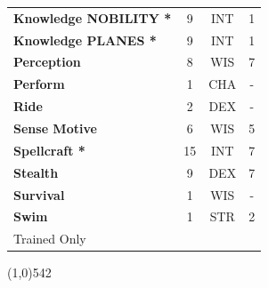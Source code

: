 \documentclass[letterpaper]{article}
\newcommand{\fullline}{\noindent\line(1,0){542} \\}
\newcommand{\B}[1]{\textbf{#1}}
\begin{document}
\begin{table}[h!]
{{\begin{tabular}{l  c  c  c}
        \hline
        \B{Knowledge {\scriptsize NOBILITY} *} & 9 & {\footnotesize INT} & 1 \\
        \B{Knowledge {\scriptsize PLANES} *} & 9 & {\footnotesize INT} & 1 \\
        \hline
        \B{Perception} & 8 & {\footnotesize WIS} & 7 \\
        \B{Perform} & 1 & {\footnotesize CHA} & - \\
        \hline
        \B{Ride} & 2 & {\footnotesize DEX} & - \\
        \B{Sense Motive} & 6 & {\footnotesize WIS} & 5 \\
        \hline
        \B{Spellcraft *} & 15 & {\footnotesize INT} & 7 \\
        \B{Stealth} & 9 & {\footnotesize DEX} & 7 \\
        \hline
        \B{Survival} & 1 & {\footnotesize WIS} & - \\
        \B{Swim} & 1 & {\footnotesize STR} & 2 \\
        {\footnotesize * Trained Only} \\
        \end{tabular}
    }
}
\vspace{-1.5em}
\end{table} \par

\vspace{-1.5em}
\fullline
\vspace{-1em}
\end{document}
